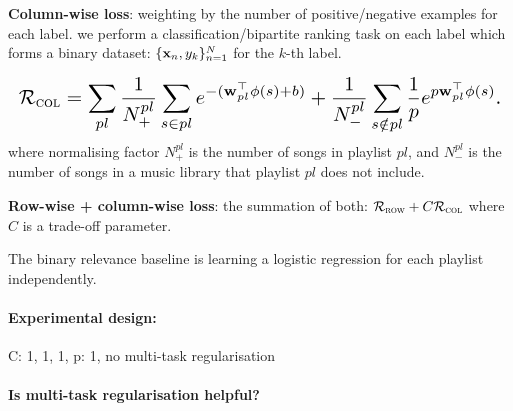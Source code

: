 {\bf Column-wise loss}: weighting by the number of positive/negative examples for each label.
\ie we perform a classification/bipartite ranking task on each label which forms a binary dataset:
$\{\mathbf{x}_n, y_k\}_{n=1}^N$ for the $k$-th label.

\begin{equation*}
\resizebox{\linewidth}{!}{$
\RCal_\textsc{col} 
= \displaystyle \sum_{pl}
  \frac{1}{N_+^{pl}} \sum_{s \in pl} e^{-(\w_{pl}^\top \phi(s) + b)} +
  \frac{1}{N_-^{pl}} \sum_{s \notin pl} \frac{1}{p} e^{p \w_{pl}^\top \phi(s)}.
$}
\end{equation*}
where normalising factor $N_+^{pl}$ is the number of songs in playlist $pl$,
and $N_-^{pl}$ is the number of songs in a music library that playlist $pl$ does not include.


{\bf Row-wise + column-wise loss}: the summation of both: $\mathcal{R}_\textsc{row} + C \mathcal{R}_\textsc{col}$ 
where $C$ is a trade-off parameter.

The binary relevance baseline is learning a logistic regression for each playlist independently.


\begin{table}[!h]
\centering
\caption{Empirical results}
\end{table}

\paragraph{Experimental design:}
C: 1, 1, 1, p: 1, no multi-task regularisation

\paragraph{Is multi-task regularisation helpful?}

